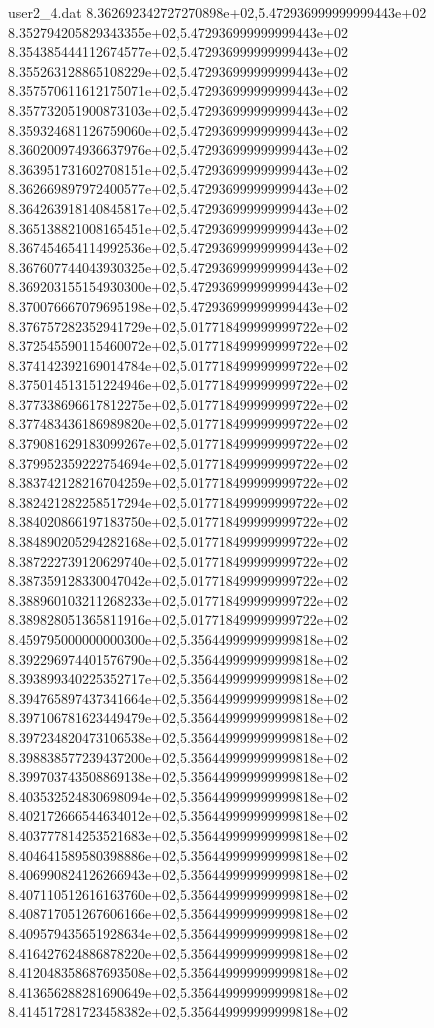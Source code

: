 \begin{filecontents}{user2_4.dat}
8.362692342727270898e+02,5.472936999999999443e+02
8.352794205829343355e+02,5.472936999999999443e+02
8.354385444112674577e+02,5.472936999999999443e+02
8.355263128865108229e+02,5.472936999999999443e+02
8.357570611612175071e+02,5.472936999999999443e+02
8.357732051900873103e+02,5.472936999999999443e+02
8.359324681126759060e+02,5.472936999999999443e+02
8.360200974936637976e+02,5.472936999999999443e+02
8.363951731602708151e+02,5.472936999999999443e+02
8.362669897972400577e+02,5.472936999999999443e+02
8.364263918140845817e+02,5.472936999999999443e+02
8.365138821008165451e+02,5.472936999999999443e+02
8.367454654114992536e+02,5.472936999999999443e+02
8.367607744043930325e+02,5.472936999999999443e+02
8.369203155154930300e+02,5.472936999999999443e+02
8.370076667079695198e+02,5.472936999999999443e+02
8.376757282352941729e+02,5.017718499999999722e+02
8.372545590115460072e+02,5.017718499999999722e+02
8.374142392169014784e+02,5.017718499999999722e+02
8.375014513151224946e+02,5.017718499999999722e+02
8.377338696617812275e+02,5.017718499999999722e+02
8.377483436186989820e+02,5.017718499999999722e+02
8.379081629183099267e+02,5.017718499999999722e+02
8.379952359222754694e+02,5.017718499999999722e+02
8.383742128216704259e+02,5.017718499999999722e+02
8.382421282258517294e+02,5.017718499999999722e+02
8.384020866197183750e+02,5.017718499999999722e+02
8.384890205294282168e+02,5.017718499999999722e+02
8.387222739120629740e+02,5.017718499999999722e+02
8.387359128330047042e+02,5.017718499999999722e+02
8.388960103211268233e+02,5.017718499999999722e+02
8.389828051365811916e+02,5.017718499999999722e+02
8.459795000000000300e+02,5.356449999999999818e+02
8.392296974401576790e+02,5.356449999999999818e+02
8.393899340225352717e+02,5.356449999999999818e+02
8.394765897437341664e+02,5.356449999999999818e+02
8.397106781623449479e+02,5.356449999999999818e+02
8.397234820473106538e+02,5.356449999999999818e+02
8.398838577239437200e+02,5.356449999999999818e+02
8.399703743508869138e+02,5.356449999999999818e+02
8.403532524830698094e+02,5.356449999999999818e+02
8.402172666544634012e+02,5.356449999999999818e+02
8.403777814253521683e+02,5.356449999999999818e+02
8.404641589580398886e+02,5.356449999999999818e+02
8.406990824126266943e+02,5.356449999999999818e+02
8.407110512616163760e+02,5.356449999999999818e+02
8.408717051267606166e+02,5.356449999999999818e+02
8.409579435651928634e+02,5.356449999999999818e+02
8.416427624886878220e+02,5.356449999999999818e+02
8.412048358687693508e+02,5.356449999999999818e+02
8.413656288281690649e+02,5.356449999999999818e+02
8.414517281723458382e+02,5.356449999999999818e+02

\end{filecontents}

